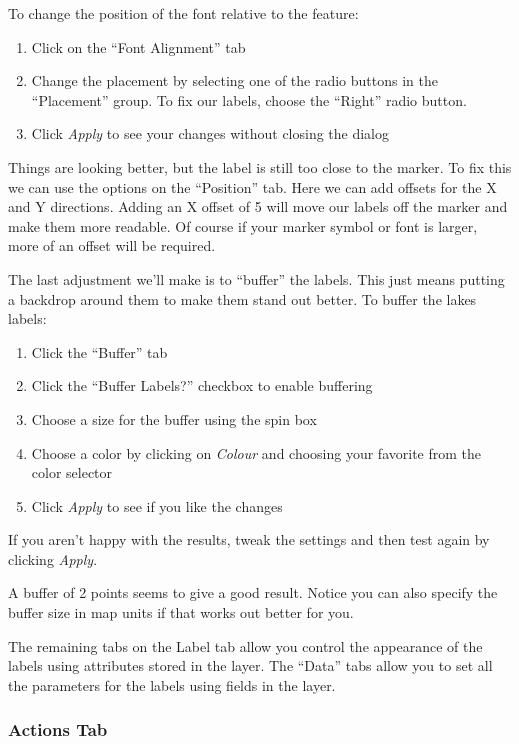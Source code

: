 To change the position of the font relative to the feature:

\begin{enumerate} 
\item Click on the ``Font Alignment'' tab
\item Change the placement by selecting one of the radio buttons
in the ``Placement'' group. To fix our labels, choose the ``Right'' radio
button. 
\item Click \textsl{Apply} to see your changes without closing the dialog
\end{enumerate} 

Things are looking better, but the label is still too close to the marker. To
fix this we can use the options on the ``Position'' tab. Here we can add
offsets for the X and Y directions. Adding an X offset of 5 will move our
labels off the marker and make them more readable. Of course if your marker
symbol or font is larger, more of an offset will be required. 

The last adjustment we'll make is to ``buffer'' the labels. This just means
putting a backdrop around them to make them stand out better. To buffer the
lakes labels:

\begin{enumerate}
\item Click the ``Buffer'' tab
\item Click the ``Buffer Labels?'' checkbox to enable buffering
\item Choose a size for the buffer using the spin box
\item Choose a color by clicking on \textsl{Colour} and choosing your
  favorite from the color selector
\item Click \textsl{Apply} to see if you like the changes
\end{enumerate} 

If you aren't happy with the results, tweak the settings and then test again
by clicking \textsl{Apply}. 

A buffer of 2 points seems to give a good result.
Notice you can also specify the buffer size in map units if that works out
better for you.

The remaining tabs on the Label tab allow you control the appearance of the
labels using attributes stored in the layer. The ``Data'' tabs allow you to
set all the parameters for the labels using fields in the layer. 

\subsubsection{Actions Tab}\label{label_actions}

